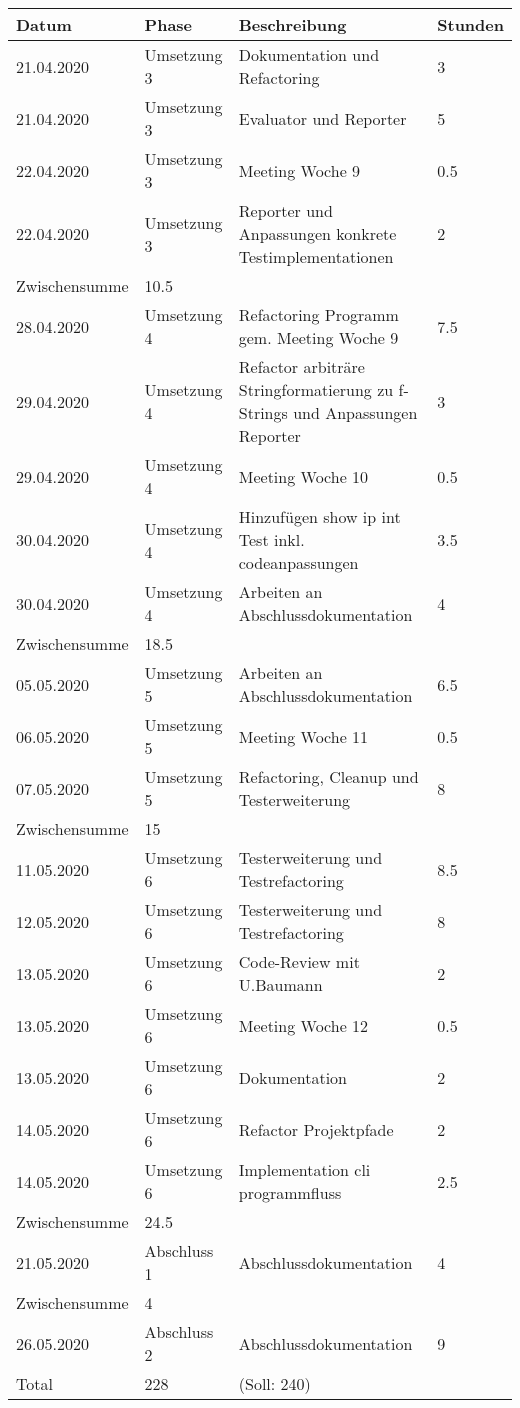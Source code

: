 \documentclass[
	ngerman,
	toc=listof, %
	toc=bibliography, %
	footnotes=multiple, %
	parskip=half, %
	numbers=noendperiod %
]{scrartcl}
\begin{document}
	\newpage

	\begin{tabularx}{\textwidth}{llXl}
		\toprule
		Datum & Phase & Beschreibung & Stunden \\
		\midrule
		21.04.2020 & Umsetzung 3 & Dokumentation und Refactoring & 3 \\
		21.04.2020 & Umsetzung 3 & Evaluator und Reporter & 5 \\
		22.04.2020 & Umsetzung 3 & Meeting Woche 9 & 0.5 \\
		22.04.2020 & Umsetzung 3 & Reporter und Anpassungen konkrete Testimplementationen & 2 \\
		\midrule
		Zwischensumme & 10.5 & & \\
		\midrule
		28.04.2020 & Umsetzung 4 & Refactoring Programm gem. Meeting Woche 9 & 7.5 \\
		29.04.2020 & Umsetzung 4 & Refactor arbiträre Stringformatierung zu f-Strings und Anpassungen Reporter & 3 \\
		29.04.2020 & Umsetzung 4 & Meeting Woche 10 & 0.5 \\
		30.04.2020 & Umsetzung 4 & Hinzufügen show ip int Test inkl. codeanpassungen & 3.5 \\
		30.04.2020 & Umsetzung 4 & Arbeiten an Abschlussdokumentation & 4 \\
		\midrule
		Zwischensumme & 18.5 & & \\
		\midrule
		05.05.2020 & Umsetzung 5 & Arbeiten an Abschlussdokumentation & 6.5 \\
		06.05.2020 & Umsetzung 5 & Meeting Woche 11 & 0.5 \\
		07.05.2020 & Umsetzung 5 & Refactoring, Cleanup und Testerweiterung & 8 \\
		\midrule
		Zwischensumme & 15 & & \\
		\midrule
		11.05.2020 & Umsetzung 6 & Testerweiterung und Testrefactoring & 8.5 \\
		12.05.2020 & Umsetzung 6 & Testerweiterung und Testrefactoring & 8 \\
		13.05.2020 & Umsetzung 6 & Code-Review mit U.Baumann & 2 \\
		13.05.2020 & Umsetzung 6 & Meeting Woche 12 & 0.5 \\
		13.05.2020 & Umsetzung 6 & Dokumentation & 2 \\
		14.05.2020 & Umsetzung 6 & Refactor Projektpfade & 2 \\
		14.05.2020 & Umsetzung 6 & Implementation cli programmfluss & 2.5\\
		\midrule
		Zwischensumme & 24.5 & & \\ 
		\midrule
		21.05.2020 & Abschluss 1 & Abschlussdokumentation & 4 \\
		\midrule
		Zwischensumme & 4 & & \\
		\midrule
		26.05.2020 & Abschluss 2 & Abschlussdokumentation & 9 \\

		\midrule
		Total & 228 & (Soll: 240) & \\
		\bottomrule
	\end{tabularx}
\end{document}
